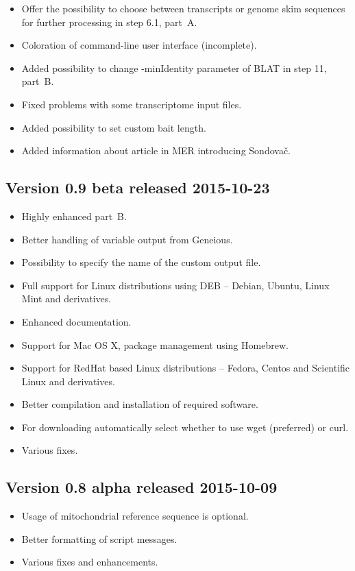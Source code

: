 \documentclass[a4paper, 11pt, twoside]{article}
\begin{document}
\begin{itemize}
  \item Offer the possibility to choose between transcripts or genome skim sequences for further processing in step 6.1, part~A.
  \item Coloration of command-line user interface (incomplete).
  \item Added possibility to change -minIdentity parameter of BLAT in step 11, part~B.
  \item Fixed problems with some transcriptome input files.
  \item Added possibility to set custom bait length.
  \item Added information about article in MER introducing Sondovač.
\end{itemize}

\subsection{Version 0.9 beta released 2015-10-23}

\begin{itemize}
  \item Highly enhanced part~B.
  \item Better handling of variable output from Geneious.
  \item Possibility to specify the name of the custom output file.
  \item Full support for Linux distributions using DEB -- Debian, Ubuntu, Linux Mint and derivatives.
  \item Enhanced documentation.
  \item Support for Mac OS X, package management using Homebrew.
  \item Support for RedHat based Linux distributions -- Fedora, Centos and Scientific Linux and derivatives.
  \item Better compilation and installation of required software.
  \item For downloading automatically select whether to use wget (preferred) or curl.
  \item Various fixes.
\end{itemize}

\subsection{Version 0.8 alpha released 2015-10-09}

\begin{itemize}
  \item Usage of mitochondrial reference sequence is optional.
  \item Better formatting of script messages.
  \item Various fixes and enhancements.
\end{itemize}
\end{document}
